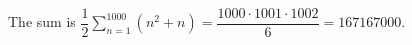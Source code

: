 The sum is $\dfrac{1}{2}\sum_{n=1}^{1000}(n^2+n)=\dfrac{1000\cdot1001\cdot1002}{6}=\boxed{167167000}$.
